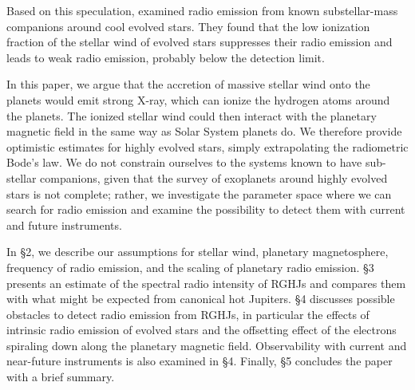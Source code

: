 \documentclass{emulateapj}
\def\memoYF#1{\color{red}$[${\bf #1}$]$ \color{black}}
\begin{document}
Based on this speculation, \citet{ignace2010} examined radio emission from known substellar-mass companions around cool evolved stars. They found that the low ionization fraction of the stellar wind of evolved stars suppresses their radio emission and leads to weak radio emission, probably below the detection limit. 

\color{red}
In this paper, we argue that the accretion of massive stellar wind onto the planets would emit strong X-ray, which can ionize the hydrogen atoms around the planets. The ionized stellar wind could then interact with the planetary magnetic field in the same way as Solar System planets do. 
We therefore provide optimistic estimates for highly evolved stars, simply extrapolating the radiometric Bode's law. 
We do not constrain ourselves to the systems known to have sub-stellar companions, given that the survey of exoplanets around highly evolved stars is not complete; rather, we investigate the parameter space where we can search for radio emission and examine the possibility to detect them with current and future instruments. 
\color{black}


In \S2, we describe our assumptions for stellar wind, planetary magnetosphere, frequency of radio emission, and the scaling of planetary radio emission.
\S3 presents an estimate of the spectral radio intensity of RGHJs and compares them with what might be expected from canonical hot Jupiters.
\S4 discusses possible obstacles to detect radio emission from RGHJs, in particular the effects of intrinsic radio emission of evolved stars and the offsetting effect of the electrons spiraling down along the planetary magnetic field.
Observability with current and near-future instruments is also examined in \S4. 
Finally, \S5 concludes the paper with a brief summary. 

\end{document}
